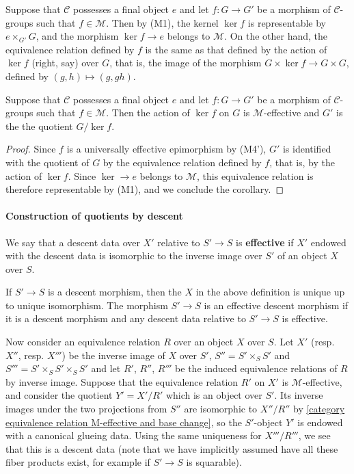 Suppose that $\mathcal{C}$ possesses a final object $e$ and let $f:G\to G'$ be a morphism of $\mathcal{C}$-groups such that $f\in\mathcal{M}$. Then by (M1), the kernel $\ker f$ is representable by $e\times_{G'}G$, and the morphism $\ker f\to e$ belongs to $\mathcal{M}$. On the other hand, the equivalence relation defined by $f$ is the same as that defined by the action of $\ker f$ (right, say) over $G$, that is, the image of the morphism $G\times \ker f\to G\times G$, defined by $(g,h)\mapsto(g,gh)$.

\begin{corollary}\label{category M-morphism kernel M-effective}
Suppose that $\mathcal{C}$ possesses a final object $e$ and let $f:G\to G'$ be a morphism of $\mathcal{C}$-groups such that $f\in\mathcal{M}$. Then the action of $\ker f$ on $G$ is $\mathcal{M}$-effective and $G'$ is the the quotient $G/\ker f$.
\end{corollary}
\begin{proof}
Since $f$ is a universally effective epimorphism by (M4'), $G'$ is identified with the quotient of $G$ by the equivalence relation defined by $f$, that is, by the action of $\ker f$. Since $\ker\to e$ belongs to $\mathcal{M}$, this equivalence relation is therefore representable by (M1), and we conclude the corollary.
\end{proof}

\paragraph{Construction of quotients by descent}
\begin{definition}
We say that a descent data over $X'$ relative to $S'\to S$ is \textbf{effective} if $X'$ endowed with the descent data is isomorphic to the inverse image over $S'$ of an object $X$ over $S$.
\end{definition}

If $S'\to S$ is a descent morphism, then the $X$ in the above definition is unique up to unique isomorphism. The morphism $S'\to S$ is an effective descent morphism if it is a descent morphism and any descent data relative to $S'\to S$ is effective.\par
Now consider an equivalence relation $R$ over an object $X$ over $S$. Let $X'$ (resp. $X''$, resp. $X'''$) be the inverse image of $X$ over $S'$, $S''=S'\times_SS'$ and $S'''=S'\times_SS'\times_SS'$ and let $R'$, $R''$, $R'''$ be the induced equivalence relations of $R$ by inverse image. Suppose that the equivalence relation $R'$ on $X'$ is $\mathcal{M}$-effective, and consider the quotient $Y'=X'/R'$ which is an object over $S'$. Its inverse images under the two projections from $S''$ are isomorphic to $X''/R''$ by \cref{category equivalence relation M-effective and base change}, so the $S'$-object $Y'$ is endowed with a canonical glueing data. Using the same uniqueness for $X'''/R'''$, we see that this is a descent data (note that we have implicitly assumed have all these fiber products exist, for example if $S'\to S$ is squarable).

